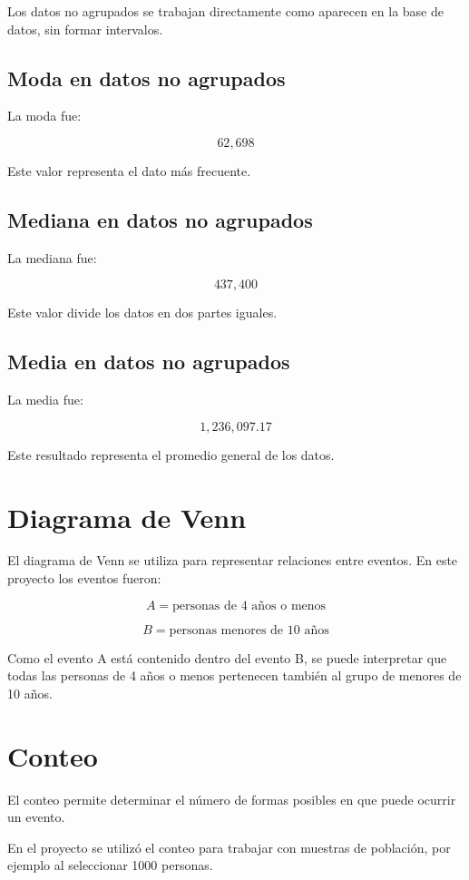 \documentclass[12pt]{article}
\begin{document}
Los datos no agrupados se trabajan directamente como aparecen en la base de datos, sin formar intervalos.

\subsection{Moda en datos no agrupados}

La moda fue:

\[
62,698
\]

Este valor representa el dato más frecuente.

\subsection{Mediana en datos no agrupados}

La mediana fue:

\[
437,400
\]

Este valor divide los datos en dos partes iguales.

\subsection{Media en datos no agrupados}

La media fue:

\[
1,236,097.17
\]

Este resultado representa el promedio general de los datos.

\section{Diagrama de Venn}

El diagrama de Venn se utiliza para representar relaciones entre eventos. En este proyecto los eventos fueron:

\[
A=\text{personas de 4 años o menos}
\]

\[
B=\text{personas menores de 10 años}
\]

Como el evento A está contenido dentro del evento B, se puede interpretar que todas las personas de 4 años o menos pertenecen también al grupo de menores de 10 años.

\section{Conteo}

El conteo permite determinar el número de formas posibles en que puede ocurrir un evento.

En el proyecto se utilizó el conteo para trabajar con muestras de población, por ejemplo al seleccionar 1000 personas.
\end{document}
